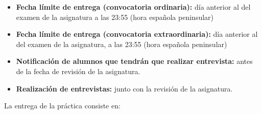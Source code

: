 \begin{itemize}
  \item \textbf{Fecha límite de entrega (convocatoria ordinaria):} día anterior al del examen de la asignatura a las 23:55 (hora española peninsular)
  \item \textbf{Fecha límite de entrega (convocatoria extraordinaria):} día anterior al del examen de la asignatura, a las 23:55 (hora española peninsular)
  \item \textbf{Notificación de alumnos que tendrán que realizar entrevista:} antes de la fecha de revisión de la asignatura.
  \item \textbf{Realización de entrevistas:} junto con la revisión de la asignatura.    

\end{itemize}

La entrega de la práctica consiste en:

